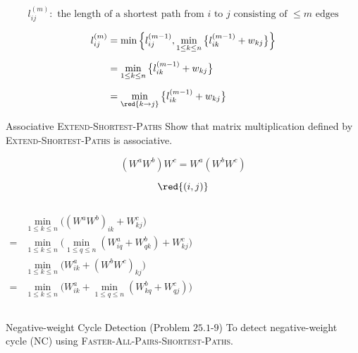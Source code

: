
\begin{frame}{}
  \[
    l_{ij}^{(m)}: \text{ the length of a shortest path from $i$ to $j$ consisting of $\le m$ edges}
  \]

  \pause
  \begin{align*}
    l_{ij}^{(m)} &= \min \Big\{ l_{ij}^{(m-1)}, \min_{1 \le k \le n} \big\{ l_{ik}^{(m-1)} + w_{kj} \big\} \Big\} \\[5pt]
		 &= \min_{1 \le k \le n} \big\{ l_{ik}^{(m-1)} + w_{kj} \big\} \\[5pt]
		 &= \min_{\red{k \to j}} \big\{ l_{ik}^{(m-1)} + w_{kj} \big\}
  \end{align*}
\end{frame}

\begin{frame}{}
  \begin{exampleblock}{Associative \textsc{Extend-Shortest-Paths}}
    Show that matrix multiplication defined by \textsc{Extend-Shortest-Paths} is associative.
  \end{exampleblock}

  \pause
  \[
    (W^{a} W^{b}) W^{c} = W^{a} (W^{b} W^{c})
  \]

  \pause
  \[
    \red{(i,j)}
  \]

  \begin{columns}
      \begin{align*}
	&\min_{1 \le k \le n} \Big( (W^{a} W^{b})_{ik} + W^{c}_{kj} \Big) \\
	= &\min_{1 \le k \le n} \Big( \min_{1 \le q \le n} (W^{a}_{iq} + W^{b}_{qk}) + W^{c}_{kj} \Big)
      \end{align*}
      \begin{align*}
	&\min_{1 \le k \le n} \Big( W^{a}_{ik} + (W^{b} W^{c})_{kj} \Big) \\
	= &\min_{1 \le k \le n} \Big( W^{a}_{ik} + \min_{1 \le q \le n} (W^{b}_{kq} + W^{c}_{qj}) \Big)
      \end{align*}
  \end{columns}
\end{frame}

\begin{frame}{}
\end{frame}

\begin{frame}{}
  \begin{exampleblock}{Negative-weight Cycle Detection (Problem $25.1$-$9$)}
    To detect negative-weight cycle (\textsf{NC}) using \textsc{Faster-All-Pairs-Shortest-Paths}.
  \end{exampleblock}
\end{frame}

